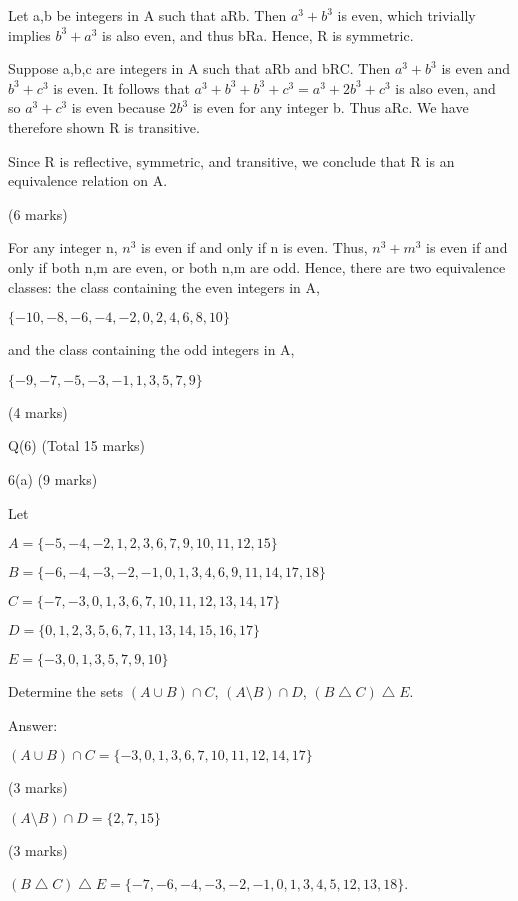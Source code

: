 \documentclass[a4paper,12pt,oneside]{book}
\theoremstyle{definition}
\begin{document}
Let a,b be integers in A such that aRb. Then $a^3+b^3$ is even, which trivially implies $b^3+a^3$ is also even, and thus bRa. Hence, R is symmetric.

Suppose a,b,c are integers in A such that aRb and bRC. Then $a^3+b^3$ is even and $b^3+c^3$ is even. It follows that $a^3+b^3+b^3+c^3 = a^3+2b^3+c^3$ is also even, and so $a^3+c^3$ is even because $2b^3$ is even for any integer b. Thus aRc. We have therefore shown R is transitive.

Since R is reflective, symmetric, and transitive, we conclude that R is an equivalence relation on A.

(6 marks)

For any integer n, $n^3$ is even if and only if n is even. Thus, $n^3+m^3$ is even if and only if both n,m are even, or both n,m are odd. Hence, there are two equivalence classes: the class containing the even integers in A, 

$\{-10,-8,-6,-4,-2,0,2,4,6,8,10\}$

and the class containing the odd integers in A,

$\{ -9, -7, -5, -3, -1, 1, 3, 5, 7, 9\}$

(4 marks)








\newpage

Q(6) (Total 15 marks)

6(a) (9 marks)

Let

$A = \{ -5, -4, -2, 1, 2, 3, 6, 7, 9, 10, 11, 12, 15 \}$

$B = \{ -6, -4, -3, -2, -1, 0, 1, 3, 4, 6, 9, 11, 14, 17, 18 \}$

$C = \{ -7, -3, 0, 1, 3, 6, 7, 10, 11, 12, 13, 14, 17 \}$

$D = \{ 0, 1, 2, 3, 5, 6, 7, 11, 13, 14, 15, 16, 17  \}$

$E = \{ -3, 0, 1, 3, 5, 7, 9, 10 \}$

Determine the sets $(A \cup B) \cap C$, $(A \setminus B) \cap D$, $(B \bigtriangleup C) \bigtriangleup E$.

Answer:

$(A \cup B) \cap C = \{ -3, 0, 1, 3, 6, 7, 10, 11, 12, 14, 17 \}$

(3 marks)

$(A \setminus B) \cap D = \{ 2, 7, 15 \}$

(3 marks)

$(B \bigtriangleup C) \bigtriangleup E = \{-7, -6, -4, -3, -2, -1, 0, 1, 3, 4, 5, 12, 13, 18\}$.
\end{document}
